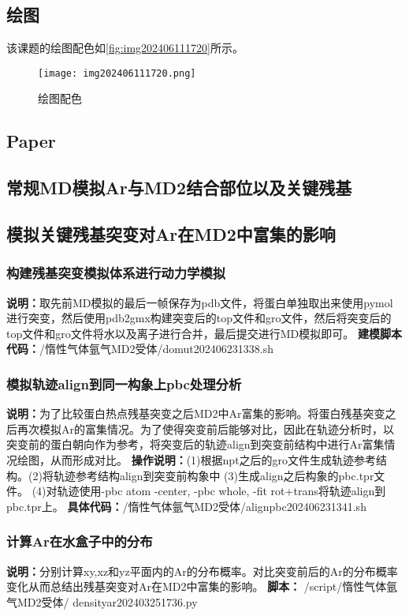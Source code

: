 \subsection{绘图}
该课题的绘图配色如\autoref{fig:img202406111720}所示。
\begin{figure}[htbp]
    \centering
    \texttt{[image: img202406111720.png]}
    \caption{\label{fig:img202406111720}绘图配色}
\end{figure}
\subsection{Paper}
\subsection{常规MD模拟Ar与MD2结合部位以及关键残基}
\subsection{模拟关键残基突变对Ar在MD2中富集的影响}
\subsubsection{构建残基突变模拟体系进行动力学模拟}
\noindent\textbf{说明：}取先前MD模拟的最后一帧保存为pdb文件，将蛋白单独取出来使用pymol进行突变，然后使用pdb2gmx构建突变后的top文件和gro文件，然后将突变后的top文件和gro文件将水以及离子进行合并，最后提交进行MD模拟即可。
\newline\textbf{建模脚本代码：}/惰性气体氩气MD2受体/domut202406231338.sh
\subsubsection{模拟轨迹align到同一构象上pbc处理分析}
\noindent\textbf{说明：}为了比较蛋白热点残基突变之后MD2中Ar富集的影响。将蛋白残基突变之后再次模拟Ar的富集情况。为了使得突变前后能够对比，因此在轨迹分析时，以突变前的蛋白朝向作为参考，将突变后的轨迹align到突变前结构中进行Ar富集情况绘图，从而形成对比。
\newline\textbf{操作说明：}(1)根据npt之后的gro文件生成轨迹参考结构。(2)将轨迹参考结构align到突变前构象中 (3)生成align之后构象的pbc.tpr文件。 (4)对轨迹使用-pbc atom -center, -pbc whole, -fit rot+trans将轨迹align到pbc.tpr上。
\newline\textbf{具体代码：}/惰性气体氩气MD2受体/alignpbc202406231341.sh
\subsubsection{计算Ar在水盒子中的分布}
\noindent\textbf{说明：}分别计算xy,xz和yz平面内的Ar的分布概率。对比突变前后的Ar的分布概率变化从而总结出残基突变对Ar在MD2中富集的影响。
\newline\textbf{脚本：} /script/惰性气体氩气MD2受体/ densityar202403251736.py
